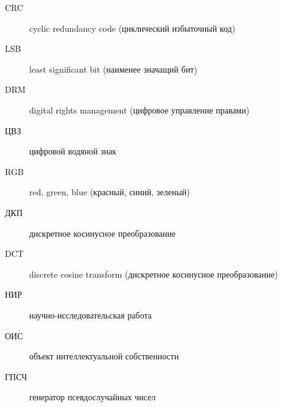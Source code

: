 \Abbreviations
\begin{description}
    \item[CRC] cyclic redundancy code (циклический избыточный код)
    \item[LSB] least significant bit (наименее значащий бит)
    \item[DRM] digital rights management (цифровое управление правами)
    \item[ЦВЗ] цифровой водяной знак
    \item[RGB] red, green, blue (красный, синий, зеленый)
    \item[ДКП] дискретное косинусное преобразование
    \item[DCT] discrete cosine transform (дискретное косинусное преобразование)
    \item[НИР] научно-исследовательская работа
    \item[ОИС] объект интеллектуальной собственности
    \item[ГПСЧ] генератор псевдослучайных чисел 
\end{description}